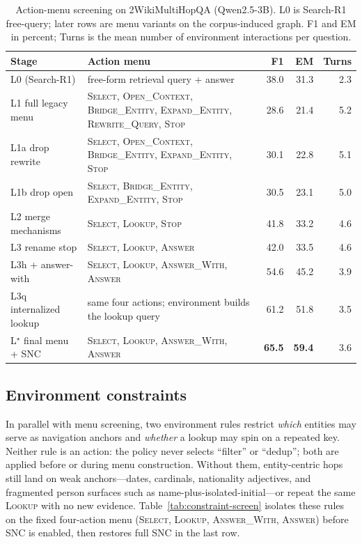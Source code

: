 \documentclass[letterpaper]{article} %
\begin{document}
\begin{table}[t]
\centering
\small
\setlength{\tabcolsep}{4pt}
\renewcommand{\arraystretch}{1.12}
\begin{tabular}{@{}lp{}rrr@{}}
\toprule
Stage & Action menu & F1 & EM & Turns \\
\midrule
L0 (Search-R1) & free-form retrieval query + answer
& 38.0 & 31.3 & 2.3 \\
L1 full legacy menu & \textsc{Select}, \textsc{Open\_Context}, \textsc{Bridge\_Entity}, \textsc{Expand\_Entity}, \textsc{Rewrite\_Query}, \textsc{Stop}
& 28.6 & 21.4 & 5.2 \\
L1a drop rewrite & \textsc{Select}, \textsc{Open\_Context}, \textsc{Bridge\_Entity}, \textsc{Expand\_Entity}, \textsc{Stop}
& 30.1 & 22.8 & 5.1 \\
L1b drop open & \textsc{Select}, \textsc{Bridge\_Entity}, \textsc{Expand\_Entity}, \textsc{Stop}
& 30.5 & 23.1 & 5.0 \\
L2 merge mechanisms & \textsc{Select}, \textsc{Lookup}, \textsc{Stop}
& 41.8 & 33.2 & 4.6 \\
L3 rename stop & \textsc{Select}, \textsc{Lookup}, \textsc{Answer}
& 42.0 & 33.5 & 4.6 \\
L3h + answer-with & \textsc{Select}, \textsc{Lookup}, \textsc{Answer\_With}, \textsc{Answer}
& 54.6 & 45.2 & 3.9 \\
L3q internalized lookup & same four actions; environment builds the lookup query
& 61.2 & 51.8 & 3.5 \\
\midrule
L$^\star$ final menu + SNC & \textsc{Select}, \textsc{Lookup}, \textsc{Answer\_With}, \textsc{Answer}
& \textbf{65.5} & \textbf{59.4} & 3.6 \\
\bottomrule
\end{tabular}
\caption{Action-menu screening on 2WikiMultiHopQA (Qwen2.5-3B). L0 is Search-R1 free-query; later rows are menu variants on the corpus-induced graph. F1 and EM in percent; Turns is the mean number of environment interactions per question.}
\label{tab:action-screen}
\end{table}

\subsection{Environment constraints}
\label{app:action-constraints}

In parallel with menu screening, two environment rules restrict \emph{which} entities may serve as navigation anchors and \emph{whether} a lookup may spin on a repeated key.
Neither rule is an action: the policy never selects ``filter'' or ``dedup''; both are applied before or during menu construction.
Without them, entity-centric hops still land on weak anchors---dates, cardinals, nationality adjectives, and fragmented person surfaces such as name-plus-isolated-initial---or repeat the same \textsc{Lookup} with no new evidence.
Table~\ref{tab:constraint-screen} isolates these rules on the fixed four-action menu (\textsc{Select}, \textsc{Lookup}, \textsc{Answer\_With}, \textsc{Answer}) before SNC is enabled, then restores full SNC in the last row.
\end{document}
